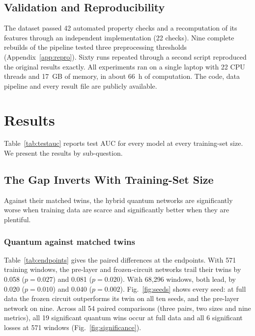 \documentclass[journal]{IEEEtran}
\begin{document}
\subsection{Validation and Reproducibility}
The dataset passed 42 automated property checks and a recomputation of its
features through an independent implementation (22 checks). Nine complete
rebuilds of the pipeline tested three preprocessing thresholds
(Appendix~\ref{app:repro}). Sixty runs repeated through a second script
reproduced the original results exactly. All experiments ran on a single
laptop with 22 CPU threads and 17~GB of memory, in about 66~h of computation.
The code, data pipeline and every result file are publicly available.



\section{Results}
\label{sec:results}
Table~\ref{tab:testauc} reports test AUC for every model at every training-set
size. We present the results by sub-question.

\subsection{The Gap Inverts With Training-Set Size}
\label{sec:sq1}
Against their matched twins, the hybrid quantum networks are significantly
worse when training data are scarce and significantly better when they are
plentiful.

\subsubsection{Quantum against matched twins}
Table~\ref{tab:endpoints} gives the paired differences at the endpoints. With
571 training windows, the pre-layer and frozen-circuit networks trail their
twins by 0.058 ($p=0.027$) and 0.081 ($p=0.020$). With 68,296 windows, both
lead, by 0.020 ($p=0.010$) and 0.040 ($p=0.002$). Fig.~\ref{fig:seeds} shows
every seed: at full data the frozen circuit outperforms its twin on all ten
seeds, and the pre-layer network on nine. Across all 54 paired comparisons
(three pairs, two sizes and nine metrics), all 19 significant quantum wins occur
at full data and all 6 significant losses at 571 windows
(Fig.~\ref{fig:significance}).
\end{document}
